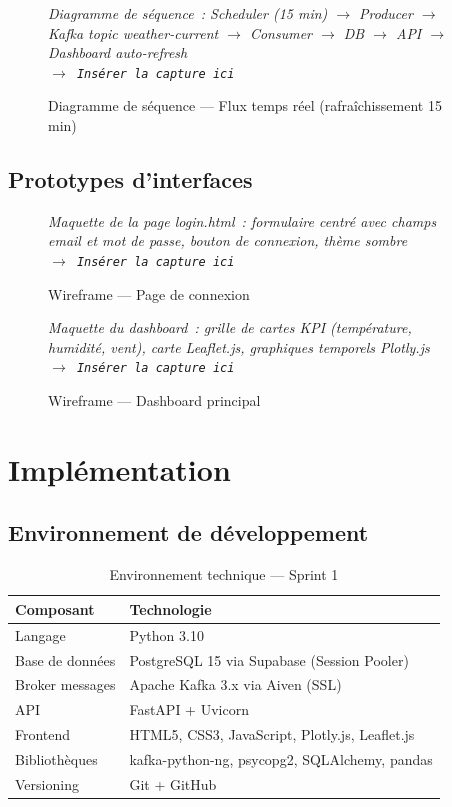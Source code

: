 \documentclass[a4paper,12pt,oneside]{report}
\newcommand{\imgplaceholder}[2]{%
  \begin{tcolorbox}[colback=blue!5,colframe=blue!40,title=#1]
    \centering\itshape #2\\[6pt]
    \texttt{$\rightarrow$ Insérer la capture ici}
  \end{tcolorbox}
}
\begin{document}
\begin{figure}[H]
\centering
\imgplaceholder{Figure~\ref{fig:seq_realtime} — Séquence temps réel}{Diagramme de séquence~: Scheduler (15 min) $\rightarrow$ Producer $\rightarrow$ Kafka topic weather-current $\rightarrow$ Consumer $\rightarrow$ DB $\rightarrow$ API $\rightarrow$ Dashboard auto-refresh}
\caption{Diagramme de séquence — Flux temps réel (rafraîchissement 15 min)}
\label{fig:seq_realtime}
\end{figure}

\subsection{Prototypes d'interfaces}

\begin{figure}[H]
\centering
\imgplaceholder{Figure~\ref{fig:wireframe_login} — Wireframe Login}{Maquette de la page login.html~: formulaire centré avec champs email et mot de passe, bouton de connexion, thème sombre}
\caption{Wireframe — Page de connexion}
\label{fig:wireframe_login}
\end{figure}

\begin{figure}[H]
\centering
\imgplaceholder{Figure~\ref{fig:wireframe_dashboard} — Wireframe Dashboard}{Maquette du dashboard~: grille de cartes KPI (température, humidité, vent), carte Leaflet.js, graphiques temporels Plotly.js}
\caption{Wireframe — Dashboard principal}
\label{fig:wireframe_dashboard}
\end{figure}

\section{Implémentation}

\subsection{Environnement de développement}

\begin{table}[H]
\centering
\caption{Environnement technique — Sprint 1}
\label{tab:env_sprint1}
\begin{tabularx}{\textwidth}{lX}
\toprule
\textbf{Composant} & \textbf{Technologie} \\
\midrule
Langage          & Python 3.10 \\
Base de données  & PostgreSQL 15 via Supabase (Session Pooler) \\
Broker messages  & Apache Kafka 3.x via Aiven (SSL) \\
API              & FastAPI + Uvicorn \\
Frontend         & HTML5, CSS3, JavaScript, Plotly.js, Leaflet.js \\
Bibliothèques   & kafka-python-ng, psycopg2, SQLAlchemy, pandas \\
Versioning       & Git + GitHub \\
\bottomrule
\end{tabularx}
\end{table}
\end{document}

